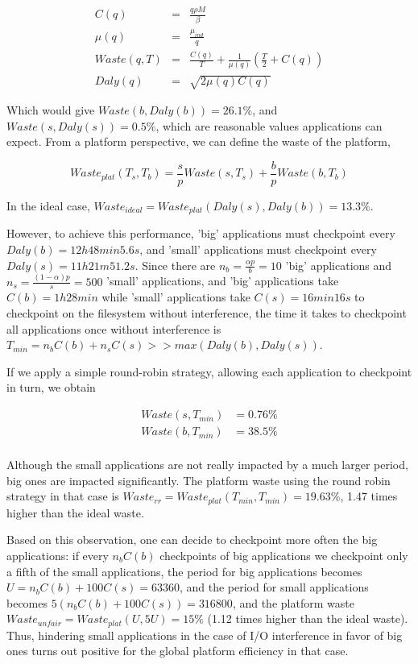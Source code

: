 \documentclass{article}
\begin{document}
\begin{eqnarray}
C(q) &=& \frac{q\rho M}{\beta}\\
\mu(q) &=& \frac{\mu_{ind}}{q}\\
Waste(q, T) &=& \frac{C(q)}{T} + \frac{1}{\mu(q)}\left(\frac{T}{2}+C(q)\right)\\
Daly(q) &=& \sqrt{2\mu(q)C(q)}
\end{eqnarray}

Which would give $Waste(b, Daly(b)) = 26.1\%$, and $Waste(s, Daly(s)) = 0.5\%$, which are reasonable values applications can expect. From a platform perspective, we can define the waste of the platform, 

$$Waste_{plat}(T_s, T_b) = \frac{s}{p}Waste(s, T_s) + \frac{b}{p}Waste(b, T_b)$$

In the ideal case, $Waste_{ideal} = Waste_{plat}(Daly(s), Daly(b)) = 13.3\%$.

However, to achieve this performance, 'big' applications must checkpoint every $Daly(b) = 12h48min5.6s$, and 'small' applications must checkpoint every $Daly(s) = 11h21m51.2s$. Since there are $n_b = \frac{\alpha p}{b} = 10$ 'big' applications and $n_s = \frac{(1-\alpha)p}{s} = 500$ 'small' applications, and 'big' applications take $C(b) = 1h28min$ while 'small' applications take $C(s) = 16min16s$ to checkpoint on the filesystem without interference, the time it takes to checkpoint all applications once without interference is $T_{min} = n_bC(b) + n_sC(s) >> max(Daly(b), Daly(s))$.

If we apply a simple round-robin strategy, allowing each application to checkpoint in turn, we obtain

$$
\begin{array}{rl}
Waste(s, T_{min}) &= 0.76\%\\
Waste(b, T_{min}) &= 38.5\%\\
\end{array}
$$

Although the small applications are not really impacted by a much larger period, big ones are impacted significantly. The platform waste using the round robin strategy in that case is $Waste_{rr} = Waste_{plat}(T_{min}, T_{min}) = 19.63\%$, 1.47 times higher than the ideal waste.

Based on this observation, one can decide to checkpoint more often the big applications: if every $n_bC(b)$ checkpoints of big applications we checkpoint only a fifth of the small applications, the period for big applications becomes $U = n_bC(b)+100C(s) = 63360$, and the period for small applications becomes $5(n_bC(b)+100C(s)) = 316800$, and the platform waste $Waste_{unfair} = Waste_{plat}(U, 5U) = 15\%$ (1.12 times higher than the ideal waste). Thus, hindering small applications in the case of I/O interference in favor of big ones turns out positive for the global platform efficiency in that case.
\end{document}
